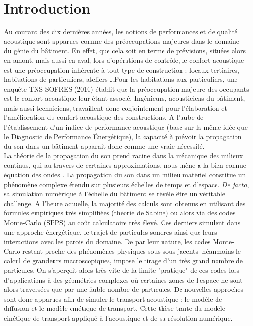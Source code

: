 \chapter{Introduction}
\label{chap:Introduction}

Au courant des dix dernières années, les notions de performances et de qualité acoustique sont apparues comme des préoccupations majeures dans le domaine du génie du bâtiment. En effet, que cela soit en terme de prévisions, situées alors en amont, mais aussi en aval, lors d'opérations de contrôle, le confort acoustique est une préoccupation inhérente à tout type de construction : locaux tertiaires, habitations de particuliers, ateliers \dots Pour les habitations aux particuliers, une enquête TNS-SOFRES (2010) établit que la préoccupation majeure des occupants est le confort acoustique leur étant associé. Ingénieurs, acousticiens du bâtiment, mais aussi techniciens, travaillent donc conjointement pour l'élaboration et l'amélioration du confort acoustique des constructions. A l'aube de l'établissement d'un indice de performance acoustique (basé sur la même idée que le Diagnostic de Performance Énergétique), la capacité à prévoir la propagation du son dans un bâtiment apparait donc comme une vraie nécessité.\\
\newline
La théorie de la propagation du son prend racine dans la mécanique des milieux continus, qui au travers de certaines approximations, nous mène à la bien connue équation des ondes \cite{13}. La propagation du son dans un milieu matériel constitue un phénomène complexe étendu sur plusieurs échelles de temps et d'espace. \textit{De facto}, sa simulation numérique à l'échelle du bâtiment se révèle être un véritable challenge. A l'heure actuelle, la majorité des calculs sont obtenus en utilisant des formules empiriques très simplifiées (théorie de Sabine) ou alors via des codes Monte-Carlo (SPPS) au coût calculatoire très élevé. Ces derniers simulent dans une approche énergétique, le trajet de particules sonores ainsi que leurs interactions avec les parois du domaine. De par leur nature, les codes Monte-Carlo restent proche des phénomènes physiques sous sous-jacents, néanmoins le calcul de grandeurs macroscopiques, impose le tirage d'un très grand nombre de particules. On s'aperçoit alors très vite de la limite "pratique" de ces codes lors d'applications à des géométries complexes où certaines zones de l'espace ne sont alors traversées que par une faible nombre de particules. De nouvelles approches sont donc apparues afin de simuler le transport acoustique : le modèle de diffusion et le modèle cinétique de transport. Cette thèse traite du modèle cinétique de transport appliqué à l'acoustique et de sa résolution numérique.

